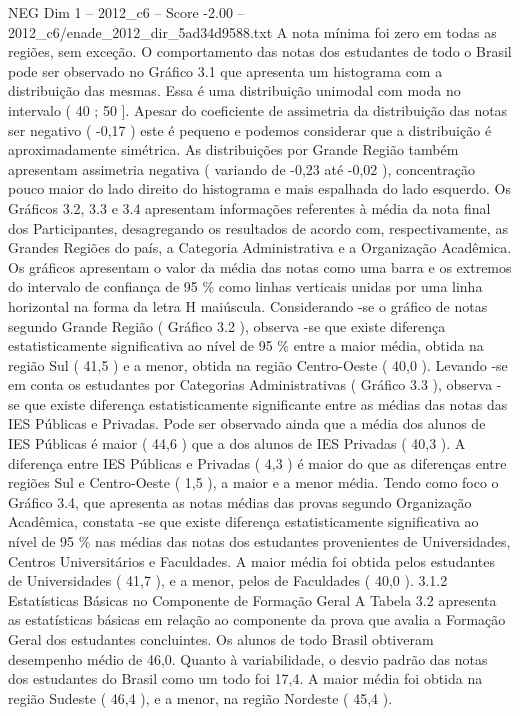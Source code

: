 \begin{textsample}{NEG Dim 1 – 2012\_c6 – Score -2.00 – 2012\_c6/enade\_2012\_dir\_5ad34d9588.txt}
A nota mínima foi zero em todas as regiões, sem exceção.
O comportamento das notas dos estudantes de todo o Brasil pode ser observado no Gráfico 3.1 que apresenta um histograma com a distribuição das mesmas.
Essa é uma distribuição unimodal com moda no intervalo ( 40 ; 50 ].
Apesar do coeficiente de assimetria da distribuição das notas ser negativo ( -0,17 ) este é pequeno e podemos considerar que a distribuição é aproximadamente simétrica.
As distribuições por Grande Região também apresentam assimetria negativa ( variando de -0,23 até -0,02 ), concentração pouco maior do lado direito do histograma e mais espalhada do lado esquerdo.
Os Gráficos 3.2, 3.3 e 3.4 apresentam informações referentes à média da nota final dos Participantes, desagregando os resultados de acordo com, respectivamente, as Grandes Regiões do país, a Categoria Administrativa e a Organização Acadêmica.
Os gráficos apresentam o valor da média das notas como uma barra e os extremos do intervalo de confiança de 95 \% como linhas verticais unidas por uma linha horizontal na forma da letra H maiúscula.
Considerando -se o gráfico de notas segundo Grande Região ( Gráfico 3.2 ), observa -se que existe diferença estatisticamente significativa ao nível de 95 \% entre a maior média, obtida na região Sul ( 41,5 ) e a menor, obtida na região Centro-Oeste ( 40,0 ).
Levando -se em conta os estudantes por Categorias Administrativas ( Gráfico 3.3 ), observa -se que existe diferença estatisticamente significante entre as médias das notas das IES Públicas e Privadas.
Pode ser observado ainda que a média dos alunos de IES Públicas é maior ( 44,6 ) que a dos alunos de IES Privadas ( 40,3 ).
A diferença entre IES Públicas e Privadas ( 4,3 ) é maior do que as diferenças entre regiões Sul e Centro-Oeste ( 1,5 ), a maior e a menor média.
Tendo como foco o Gráfico 3.4, que apresenta as notas médias das provas segundo Organização Acadêmica, constata -se que existe diferença estatisticamente significativa ao nível de 95 \% nas médias das notas dos estudantes provenientes de Universidades, Centros Universitários e Faculdades.
A maior média foi obtida pelos estudantes de Universidades ( 41,7 ), e a menor, pelos de Faculdades ( 40,0 ). 3.1.2 Estatísticas Básicas no Componente de Formação Geral A Tabela 3.2 apresenta as estatísticas básicas em relação ao componente da prova que avalia a Formação Geral dos estudantes concluintes.
Os alunos de todo Brasil obtiveram desempenho médio de 46,0.
Quanto à variabilidade, o desvio padrão das notas dos estudantes do Brasil como um todo foi 17,4.
A maior média foi obtida na região Sudeste ( 46,4 ), e a menor, na região Nordeste ( 45,4 ).

\end{textsample}
